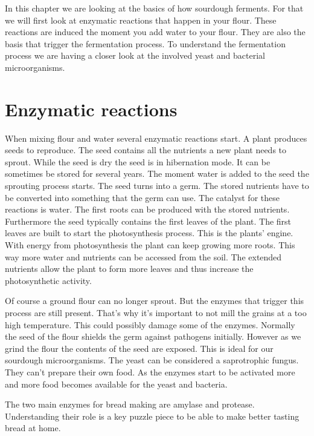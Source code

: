 In this chapter we are looking at the basics of how sourdough ferments.
For that we will first look at enzymatic reactions
that happen in your flour. These reactions are induced
the moment you add water to your flour. They are also
the basis that trigger the fermentation process. To understand
the fermentation process we are having a closer look at the involved
yeast and bacterial microorganisms.

\section{Enzymatic reactions}

When mixing flour and water several enzymatic reactions
start. A plant produces seeds to reproduce. The seed
contains all the nutrients a new plant needs to sprout.
While the seed is dry the seed is in hibernation mode. It
can be sometimes be stored for several years. The moment water is added
to the seed the sprouting process starts. The seed turns
into a germ. The stored nutrients have to be converted
into something that the germ can use. The catalyst for these
reactions is water. The first roots can be produced with the stored nutrients.
Furthermore the seed typically contains the first leaves
of the plant. The first leaves are built to start the photosynthesis
process. This is the plants' engine. With energy from photosynthesis
the plant can keep growing more roots. This way more water
and nutrients can be accessed from the soil. The extended 
nutrients allow the plant to form more leaves and thus
increase the photosynthetic activity.

Of course a ground flour can no longer sprout. But the enzymes
that trigger this process are still present. That's why it's
important to not mill the grains at a too high temperature.
This could possibly damage some of the enzymes. Normally
the seed of the flour shields the germ against pathogens initially.
However as we grind the flour the contents of the seed
are exposed. This is ideal for our sourdough microorganisms.
The yeast can be considered a saprotrophic fungus.
They can't prepare their own food. As the enzymes start
to be activated more and more food becomes available
for the yeast and bacteria.

The two main enzymes for bread making are amylase and protease.
Understanding their role is a key puzzle piece to be able
to make better tasting bread at home.

